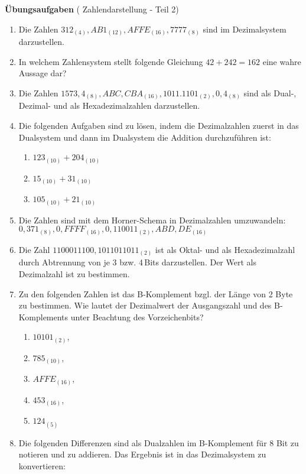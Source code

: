 \documentclass[12pt,a4paper]{scrreprt}
\begin{document}
\large{\textbf{Übungsaufgaben} ( Zahlendarstellung - Teil 2)}

\begin{enumerate}

\item Die Zahlen $312_(4), AB1_(12), AFFE_(16), 7777_(8)$ sind im Dezimalsystem darzustellen.

\item In welchem Zahlensystem stellt folgende Gleichung $42 + 242 = 16 2$ eine wahre Aussage dar?

\item Die Zahlen $1573,4_(8), ABC,CBA_(16), 1011.1101_(2), 0,4_(8)$ sind als Dual-, Dezimal- und als Hexadezimalzahlen darzustellen.

\item Die folgenden Aufgaben sind zu lösen, indem die Dezimalzahlen zuerst in das Dualsystem und dann im Dualsystem die Addition durchzuführen ist:

\begin{enumerate}
\item $123_(10) + 204_(10)$
\item $15_(10) + 31_(10)$
\item $105_(10) + 21_(10)$
\end{enumerate}

\item Die Zahlen sind mit dem Horner-Schema in Dezimalzahlen umzuwandeln: $0, 371_(8), 0,FFFF_(16), 0,110011_(2), ABD,DE_(16)$

\item Die Zahl $1100011100,1011011011_(2)$ ist als Oktal- und als Hexadezimalzahl durch Abtrennung von je 3 bzw. 4\,Bits darzustellen. Der Wert als Dezimalzahl ist zu bestimmen.

\item Zu den folgenden Zahlen ist das B-Komplement bzgl. der Länge von 2 Byte zu bestimmen. Wie lautet der Dezimalwert der Ausgangszahl
und des B-Komplements unter Beachtung des Vorzeichenbits?

\begin{enumerate}
\item $10101_(2)$,
\item $785_(10)$,
\item $AFFE_(16)$,
\item $453_(16)$,
\item $124_(5)$
\end{enumerate}

\item Die folgenden Differenzen sind als Dualzahlen im B-Komplement für 8 Bit zu notieren und zu addieren. Das Ergebnis ist in das Dezimalsystem zu konvertieren:


\end{enumerate}
\end{document}
